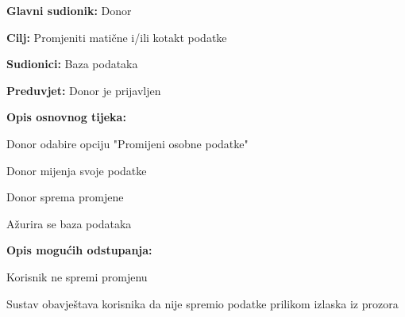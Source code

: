 					\begin{packed_item}
	
						\item \textbf{Glavni sudionik: }Donor
						\item \textbf{Cilj:} Promjeniti matične i/ili kotakt podatke
						\item \textbf{Sudionici:} Baza podataka
						\item \textbf{Preduvjet:} Donor je prijavljen
						\item \textbf{Opis osnovnog tijeka:}
						
						\item[] \begin{packed_enum}
	
							\item Donor odabire opciju "Promijeni osobne podatke"
							\item Donor mijenja svoje podatke
							\item Donor sprema promjene
							\item Ažurira se baza podataka
							
						\end{packed_enum}

						\item  \textbf{Opis mogućih odstupanja:}
						
						\item[] \begin{packed_item}
	
							\item[2.a] Korisnik ne spremi promjenu
							\item[] \begin{packed_enum}
								
								\item  Sustav obavještava korisnika da nije spremio podatke prilikom izlaska iz prozora

								
									\end{packed_enum}
								\end{packed_item}
					\end{packed_item}
\noindent {}
